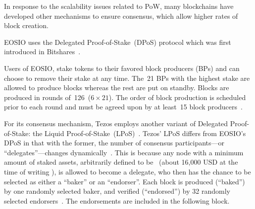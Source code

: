 In response to the scalability issues related to PoW, many blockchains have developed other mechanisms to ensure consensus, which allow higher rates of block creation.

\label{sec:DPoS}
EOSIO uses the Delegated Proof-of-Stake~(DPoS) protocol which was first introduced in Bitshares~\cite{bitshares}.

Users of EOSIO, stake  tokens to their favored block producers (BPs) and can choose to remove their stake at any time. 
The~21 BPs with the highest stake are allowed to produce blocks whereas the rest are put on standby. 
Blocks are produced in rounds of~126~($6 \times 21$). 
The order of block production is scheduled prior to each round and must be agreed upon by at least~15 block producers~\cite{EOS}.


For its consensus mechanism, Tezos employs another variant of Delegated Proof-of-Stake: the Liquid Proof-of-Stake~(LPoS)~\cite{Tezos2018}.
Tezos' LPoS differs from EOSIO's DPoS in that with the former, the number of consensus participants---or ``delegates''---changes dynamically~\cite{Tezos2018, Goodman2014}.
This is because any node with a minimum amount of staked assets, arbitrarily defined to be~  (about 16,000 USD at the time of writing \cite{CoinMarketCap2020}), is allowed to become a delegate, who then has the chance to be selected as either a ``baker'' or an ``endorser''.
Each block is produced (``baked'') by one randomly selected baker, and verified (``endorsed'') by 32 randomly selected endorsers~\cite{Tezos2018}. 
The endorsements are included in the following block.



